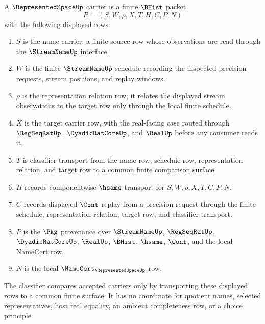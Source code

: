\begin{definition}
\label{def:representedspace-carrier}
A $\RepresentedSpaceUp$ carrier is a finite $\BHist$ packet
$$
R=(S,W,\rho,X,T,H,C,P,N)
$$
with the following displayed rows:
\begin{enumerate}
\item $S$ is the name carrier: a finite source row whose observations are read
through the $\StreamNameUp$ interface.
\item $W$ is the finite $\StreamNameUp$ schedule recording the inspected
precision requests, stream positions, and replay windows.
\item $\rho$ is the representation relation row; it relates the displayed
stream observations to the target row only through the local finite schedule.
\item $X$ is the target carrier row, with the real-facing case routed through
$\RegSeqRatUp$, $\DyadicRatCoreUp$, and $\RealUp$ before any consumer reads it.
\item $T$ is classifier transport from the name row, schedule row,
representation relation, and target row to a common finite comparison surface.
\item $H$ records componentwise $\hsame$ transport for $S,W,\rho,X,T,C,P,N$.
\item $C$ records displayed $\Cont$ replay from a precision request through the
finite schedule, representation relation, target row, and classifier transport.
\item $P$ is the $\Pkg$ provenance over $\StreamNameUp$, $\RegSeqRatUp$,
$\DyadicRatCoreUp$, $\RealUp$, $\BHist$, $\hsame$, $\Cont$, and the local
NameCert row.
\item $N$ is the local $\NameCert_{\RepresentedSpaceUp}$ row.
\end{enumerate}
The classifier compares accepted carriers only by transporting these displayed
rows to a common finite surface. It has no coordinate for quotient names,
selected representatives, host real equality, an ambient completeness row, or a
choice principle.
\end{definition}

